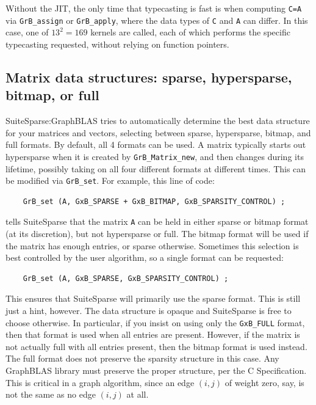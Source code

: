 Without the JIT,
the only time that typecasting is fast is when computing \verb'C=A' via
\verb'GrB_assign' or \verb'GrB_apply', where the data types of \verb'C' and
\verb'A' can differ.  In this case, one of $13^2 = 169$ kernels are called,
each of which performs the specific typecasting requested, without relying on
function pointers.

\subsection{Matrix data structures: sparse, hypersparse, bitmap, or full}

SuiteSparse:GraphBLAS tries to automatically determine the best data structure
for your matrices and vectors, selecting between sparse, hypersparse, bitmap,
and full formats.  By default, all 4 formats can be used.  A matrix typically
starts out hypersparse when it is created by \verb'GrB_Matrix_new', and then
changes during its lifetime, possibly taking on all four different formats
at different times.  This can be modified via \verb'GrB_set'.  For example,
this line of code:

    {\footnotesize
    \begin{verbatim}
    GrB_set (A, GxB_SPARSE + GxB_BITMAP, GxB_SPARSITY_CONTROL) ; \end{verbatim}}

\noindent
tells SuiteSparse that the matrix \verb'A' can be held in either sparse or
bitmap format (at its discretion), but not hypersparse or full.  The bitmap
format will be used if the matrix has enough entries, or sparse otherwise.
Sometimes this selection is best controlled by the user algorithm, so a single
format can be requested:

    {\footnotesize
    \begin{verbatim}
    GrB_set (A, GxB_SPARSE, GxB_SPARSITY_CONTROL) ; \end{verbatim}}

This ensures that SuiteSparse will primarily use the sparse format.  This is
still just a hint, however.  The data structure is opaque and SuiteSparse is
free to choose otherwise.  In particular, if you insist on using only the
\verb'GxB_FULL' format, then that format is used when all entries are present.
However, if the matrix is not actually full with all entries present, then the
bitmap format is used instead.  The full format does not preserve the sparsity
structure in this case.  Any GraphBLAS library must preserve the proper
structure, per the C Specification.  This is critical in a graph algorithm,
since an edge $(i,j)$ of weight zero, say, is not the same as no edge $(i,j)$
at all.

